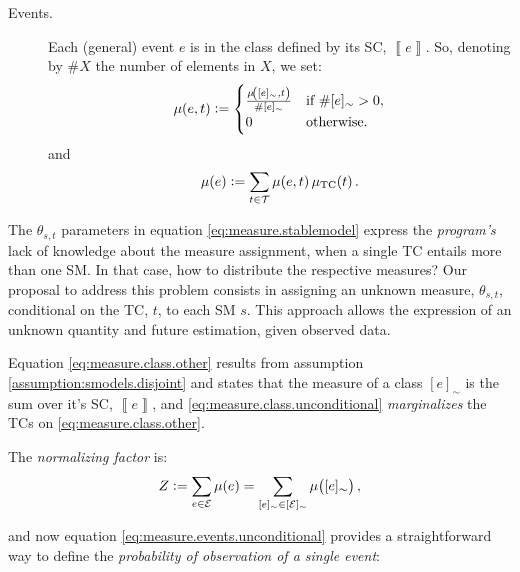 \documentclass{llncs}
\newcommand{\at}[1]{\ensuremath{\!\del{#1}}}
\newcommand{\fml}[1]{\ensuremath{{\cal #1}}}
\newcommand{\stablecore}[1]{\ensuremath{\left\llbracket #1 \right\rrbracket}}
\newcommand{\pw}[1]{\ensuremath{\mu\at{#1}}}
\newcommand{\pwcfname}{\ensuremath{\mu_{\textrm{TC}}}}
\newcommand{\pwc}[1]{\ensuremath{\pwcfname\at{#1}}}
\newcommand{\class}[1]{\ensuremath{[{#1}]_{\sim}}}
\newcommand{\indepclass}{\ensuremath{\Diamond}}
\begin{document}
\begin{description}
    \item[Events.] \label{item:event.cases} Each (general) event $e$ is in the class defined by its \acl{SC}, $\stablecore{e}$. So, denoting by $\# X$ the number of elements in $X$, we set:
          \begin{equation}
              \pw{e, t} :=
              \begin{cases}
                  \frac{\pw{\class{e}, t}}{\# \class{e}} & \text{if~}\# \class{e} > 0, \\
                  0                                      & \text{otherwise}.
              \end{cases}
              \label{eq:measure.events}
          \end{equation}
          and
          \begin{equation}
              \pw{e} := \sum_{t\in\fml{T}} \pw{e, t} \pwc{t}.
              \label{eq:measure.events.unconditional}
          \end{equation}
\end{description}



The $\theta_{s,t}$ parameters in equation \eqref{eq:measure.stablemodel} express the \emph{program's} lack of knowledge about the measure assignment, when a single \acl{TC} entails more than one \acl{SM}. In that case, how to distribute the respective measures? Our proposal to address this problem consists in assigning an unknown measure, $\theta_{s,t}$, conditional on the \acl{TC}, $t$, to each \acl{SM} $s$. This approach allows the expression of an unknown quantity and future estimation, given observed data.

Equation \eqref{eq:measure.class.other} results from assumption \ref{assumption:smodels.disjoint} and states that the measure of a class $\class{e}$ is the sum over it's \acl{SC}, $\stablecore{e}$, and \eqref{eq:measure.class.unconditional} \emph{marginalizes} the \acp{TC} on \eqref{eq:measure.class.other}.

The \emph{normalizing factor} is:
\begin{equation*}
    Z :=
    \sum_{e \in \fml{E}} \pw{e} =
    \sum_{\class{e} \in \class{\fml{E}}} \pw{\class{e}},
\end{equation*}

and now equation \eqref{eq:measure.events.unconditional} provides a straightforward way to define the \emph{probability of observation of a single event}:
\end{document}
